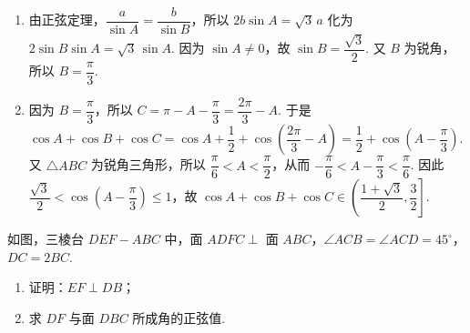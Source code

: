 \begin{solution}
\begin{enumerate}
\item 由正弦定理，\(\dfrac{a}{\sin A}=\dfrac{b}{\sin B}\)，所以 \(2b\sin A=\sqrt3\,a\) 化为 \(2\sin B\sin A=\sqrt3\,\sin A\). 因为 \(\sin A\ne0\)，故 \(\sin B=\dfrac{\sqrt3}{2}\). 又 \(B\) 为锐角，所以 \(B=\dfrac{\pi}{3}\).

\item 因为 \(B=\dfrac{\pi}{3}\)，所以 \(C=\pi-A-\dfrac{\pi}{3}=\dfrac{2\pi}{3}-A\). 于是
\(\cos A+\cos B+\cos C=\cos A+\dfrac12+\cos\left(\dfrac{2\pi}{3}-A\right)=\dfrac12+\cos\left(A-\dfrac{\pi}{3}\right)\).
又 \(\triangle ABC\) 为锐角三角形，所以 \(\dfrac{\pi}{6}<A<\dfrac{\pi}{2}\)，从而 \(-\dfrac{\pi}{6}<A-\dfrac{\pi}{3}<\dfrac{\pi}{6}\). 因此
\(\dfrac{\sqrt3}{2}<\cos\left(A-\dfrac{\pi}{3}\right)\le1\)，故
\(\cos A+\cos B+\cos C\in\left(\dfrac{1+\sqrt3}{2},\dfrac32\right]\).
\end{enumerate}
\end{solution}

\begin{problem}
如图，三棱台 \(DEF-ABC\) 中，面 \(ADFC\perp\) 面 \(ABC\)，\(\angle ACB=\angle ACD=45^\circ\)，\(DC=2BC\).

\begin{enumerate}
\item 证明：\(EF\perp DB\)；

\item 求 \(DF\) 与面 \(DBC\) 所成角的正弦值.
\end{enumerate}

\begin{center}
\end{center}
\end{problem}

